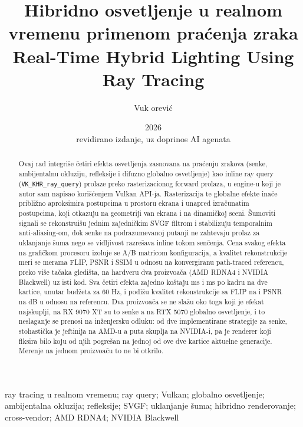 \documentclass[master,a4paper,12pt,oneside]{etf}
\title{Hibridno osvetljenje u realnom vremenu primenom pra\'cenja zraka\\[0.6ex]
       {\large Real-Time Hybrid Lighting Using Ray Tracing}}
\author{Vuk \DJ or\dj evi\'c}
\date{2026\\[1.5ex]{\normalsize revidirano izdanje, uz doprinos AI agenata}}
\begin{document}
\maketitle

\begin{abstract}
Ovaj rad integri\v{s}e \v{c}etiri efekta osvetljenja zasnovana na pra\'cenju zrakova (senke,
ambijentalnu okluziju, refleksije i difuzno globalno osvetljenje) kao inline ray query
(\texttt{VK_KHR_ray_query}) prolaze preko rasterizacionog forward prolaza, u engine-u koji je autor
sam napisao kori\v{s}\'cenjem Vulkan API-ja. Rasterizacija te globalne efekte ina\v{c}e pribli\v{z}no
aproksimira postupcima u
prostoru ekrana i unapred izra\v{c}unatim postupcima, koji otkazuju na geometriji van ekrana i na
dinami\v{c}koj sceni. \v{S}umoviti signali se rekonstrui\v{s}u jednim zajedni\v{c}kim SVGF filtrom i
stabilizuju temporalnim anti-aliasing-om, dok senke na podrazumevanoj putanji ne zahtevaju prolaz za
uklanjanje \v{s}uma nego se vidljivost razre\v{s}ava inline tokom sen\v{c}enja. Cena svakog efekta na grafi\v{c}kom procesoru izoluje se
A/B matricom konfiguracija, a kvalitet rekonstrukcije meri se merama FLIP, PSNR i SSIM u odnosu na
konvergiranu path-traced referencu, preko vi\v{s}e ta\v{c}aka gledi\v{s}ta, na hardveru dva
proizvo\dj a\v{c}a (AMD RDNA4 i NVIDIA Blackwell) uz isti kod. Sva \v{c}etiri efekta zajedno ko\v{s}taju
\perfTotalAMD{} ms i \perfTotalNV{} ms po kadru na dve kartice, unutar bud\v{z}eta za 60 Hz, i
podi\v{z}u kvalitet rekonstrukcije sa FLIP \qRasterFlip{} na \qAllRtFlip{} i PSNR \qRasterPsnr{} na
\qAllRtPsnr{} dB u odnosu na referencu. Dva proizvo\dj a\v{c}a se ne sla\v{z}u oko toga koji je efekat
najskuplji, na RX 9070 XT su to senke a na RTX 5070 globalno osvetljenje, i to neslaganje se prenosi
na in\v{z}enjersku odluku: od dve implementirane strategije za senke, stohasti\v{c}ka je jeftinija na
AMD-u a \perfShadowRatioNV{} puta skuplja na NVIDIA-i, pa je renderer koji fiksira bilo koju od njih
pogre\v{s}an na jednoj od ove dve kartice aktuelne generacije. Merenje na jednom proizvo\dj a\v{c}u to
ne bi otkrilo.
\end{abstract}

\begin{keywords}
ray tracing u realnom vremenu; ray query; Vulkan; globalno osvetljenje; ambijentalna okluzija;
refleksije; SVGF; uklanjanje \v{s}uma; hibridno renderovanje; cross-vendor; AMD RDNA4; NVIDIA Blackwell
\end{keywords}
\end{document}
